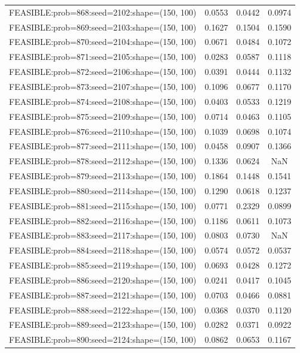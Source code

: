 \begin{longtable}{lccc}
FEASIBLE:prob=868:seed=2102:shape=(150, 100) & 0.0553 & 0.0442 & 0.0974 \\
FEASIBLE:prob=869:seed=2103:shape=(150, 100) & 0.1627 & 0.1504 & 0.1590 \\
FEASIBLE:prob=870:seed=2104:shape=(150, 100) & 0.0671 & 0.0484 & 0.1072 \\
FEASIBLE:prob=871:seed=2105:shape=(150, 100) & 0.0283 & 0.0587 & 0.1118 \\
FEASIBLE:prob=872:seed=2106:shape=(150, 100) & 0.0391 & 0.0444 & 0.1132 \\
FEASIBLE:prob=873:seed=2107:shape=(150, 100) & 0.1096 & 0.0677 & 0.1170 \\
FEASIBLE:prob=874:seed=2108:shape=(150, 100) & 0.0403 & 0.0533 & 0.1219 \\
FEASIBLE:prob=875:seed=2109:shape=(150, 100) & 0.0714 & 0.0463 & 0.1105 \\
FEASIBLE:prob=876:seed=2110:shape=(150, 100) & 0.1039 & 0.0698 & 0.1074 \\
FEASIBLE:prob=877:seed=2111:shape=(150, 100) & 0.0458 & 0.0907 & 0.1366 \\
FEASIBLE:prob=878:seed=2112:shape=(150, 100) & 0.1336 & 0.0624 &    NaN \\
FEASIBLE:prob=879:seed=2113:shape=(150, 100) & 0.1864 & 0.1448 & 0.1541 \\
FEASIBLE:prob=880:seed=2114:shape=(150, 100) & 0.1290 & 0.0618 & 0.1237 \\
FEASIBLE:prob=881:seed=2115:shape=(150, 100) & 0.0771 & 0.2329 & 0.0899 \\
FEASIBLE:prob=882:seed=2116:shape=(150, 100) & 0.1186 & 0.0611 & 0.1073 \\
FEASIBLE:prob=883:seed=2117:shape=(150, 100) & 0.0803 & 0.0730 &    NaN \\
FEASIBLE:prob=884:seed=2118:shape=(150, 100) & 0.0574 & 0.0572 & 0.0537 \\
FEASIBLE:prob=885:seed=2119:shape=(150, 100) & 0.0693 & 0.0428 & 0.1272 \\
FEASIBLE:prob=886:seed=2120:shape=(150, 100) & 0.0241 & 0.0417 & 0.1045 \\
FEASIBLE:prob=887:seed=2121:shape=(150, 100) & 0.0703 & 0.0466 & 0.0881 \\
FEASIBLE:prob=888:seed=2122:shape=(150, 100) & 0.0368 & 0.0370 & 0.1120 \\
FEASIBLE:prob=889:seed=2123:shape=(150, 100) & 0.0282 & 0.0371 & 0.0922 \\
FEASIBLE:prob=890:seed=2124:shape=(150, 100) & 0.0862 & 0.0653 & 0.1167 \\

\end{longtable}
